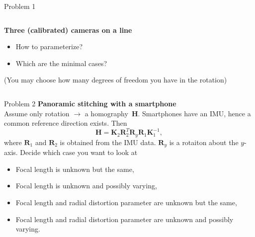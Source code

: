 \documentclass[aspectratio=169]{beamer}
\newcommand{\mat}[1]{\bm{#1}}
\newcommand{\T}{T}
\begin{document}
\begin{frame}{Problem 1}
\begin{columns}
    \begin{column}{0.5\textwidth}
        \textbf{Three (calibrated) cameras on a line}\\[8mm]
        \begin{itemize}
            \item How to parameterize?
            \item Which are the minimal cases?
        \end{itemize}
    \vspace{8mm}
    \footnotesize{(You may choose how many degrees of freedom you have in the rotation)}
    \end{column}%
    \begin{column}{0.5\textwidth}
        \centering
        
    \end{column}
\end{columns}
\end{frame}

\begin{frame}{Problem 2}
\textbf{Panoramic stitching with a smartphone}\\[2mm]
Assume only rotation $\longrightarrow$ a homography~$\mat{H}$. Smartphones have an
IMU, hence a common reference direction exists. Then
\begin{equation*}
    \mat{H} = \mat{K}_2\mat{R}_2^\T\mat{R}_y\mat{R}_1\mat{K}_1^{-1},
\end{equation*}
where $\mat{R}_1$ and $\mat{R}_2$ is obtained from the IMU data. $\mat{R}_y$ is
a rotaiton about the $y$-axis.
Decide which case you want to look at
\begin{itemize}
    \item Focal length is unknown but the same,
    \item Focal length is unknown and possibly varying,
    \item Focal length and radial distortion parameter are unknown but the same,
    \item Focal length and radial distortion parameter are unknown and possibly varying.
\end{itemize}
\end{frame}
\end{document}
